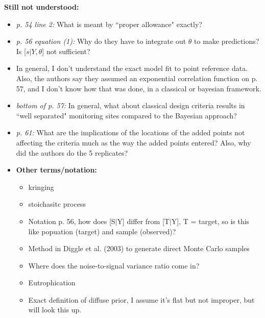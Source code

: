 \documentclass{article}\usepackage[]{graphicx}\usepackage[]{color}
\begin{document}
{\bf Still not understood:}
\begin{itemize}
\item {\it p. 54 line 2:} What is meant by ``proper allowance" exactly?

\item {\it p. 56 equation (1):} Why do they have to integrate out $\theta$ to make predictions? Is [$s|Y,\theta$] not sufficient?

\item In general, I don't understand the exact model fit to point reference data. Also, the authors say they assumed an exponential correlation function on p. 57, and I don't know how that was done, in a classical or bayesian framework. 

\item {\it bottom of p. 57:} In general, what about classical design criteria results in ``well separated" monitoring sites compared to the Bayesian approach?

\item {\it p. 61:} What are the implications of the locations of the added points not affecting the criteria much as the way the added points entered? Also, why did the authors do the 5 replicates?

\item {\bf Other terms/notation:}
\begin{itemize}
\item kringing

\item stoichasitc process

\item Notation p. 56, how does [S$|$Y] differ from [T$|$Y], T = target, so is this like popuation (target) and sample (observed)?

\item Method in Diggle et al. (2003) to generate direct Monte Carlo samples

\item Where does the noise-to-signal variance ratio come in?

\item Eutrophication

\item Exact definition of diffuse prior, I assume it's flat but not improper, but will look this up.

\end{itemize}
\end{itemize}
\end{document}
